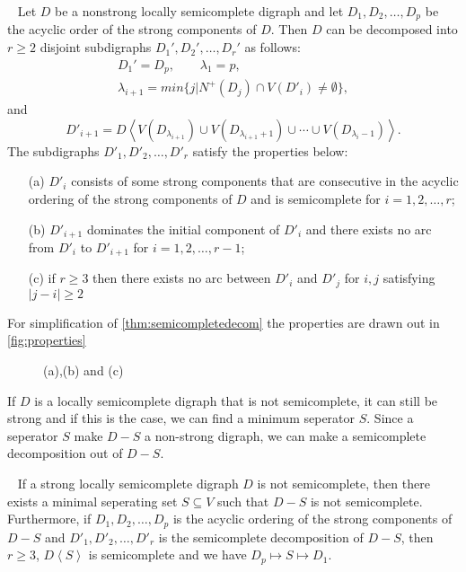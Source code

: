\begin{thm}~\cite{bangJGT85,banggutin,bangJCT102}
    Let $D$ be a nonstrong locally semicomplete digraph and let $D_1,D_2,\dots,D_p$ be the acyclic order of the strong components of $D$. Then $D$ can be decomposed into $r\geq 2$ disjoint subdigraphs $D_1',D_2',\dots, D_r'$ as follows:
    \begin{align*}
        D_1'=D_p, \qquad \lambda_1=p,\\
        \lambda_{i+1}=min\lbrace j|N^+(D_j)\cap V(D'_i)\neq \emptyset\rbrace,
    \end{align*}
    and
    \begin{equation*}
        D'_{i+1}=D\left< V(D_{\lambda_{i+1}})\cup V(D_{\lambda_{i+1}+1})\cup \cdots \cup V(D_{\lambda_{i}-1})\right> .
    \end{equation*}
    The subdigraphs $D'_1,D'_2,\dots,D'_r$ satisfy the properties below:
    \begin{itemize}
        \item[(a)] $D'_i$ consists of some strong components that are consecutive in the acyclic ordering of the strong components of $D$ and is semicomplete for $i=1,2,\dots ,r$;
        \item[(b)] $D'_{i+1}$ dominates the initial component of $D'_i$ and there exists no arc from $D'_i$ to $D'_{i+1}$ for $i=1,2,\dots ,r-1$;
        \item[(c)] if $r\geq 3$ then there exists no arc between $D'_i$ and $D'_j$ for $i,j$ satisfying $|j-i|\geq 2$  
    \end{itemize}
    \label{thm:semicompletedecom}
\end{thm}
For simplification of \autoref{thm:semicompletedecom} the properties are drawn out in \autoref{fig:properties}
\begin{figure}
    \caption{(a),(b) and (c)}
    \label{fig:properties}
\end{figure}
If $D$ is a locally semicomplete digraph that is not semicomplete, it can still be strong and if this is the case, we can find a minimum seperator $S$. Since a seperator $S$ make $D-S$ a non-strong digraph, we can make a semicomplete decomposition out of $D-S$.
\begin{thm}~\cite{banggutin}
    If a strong locally semicomplete digraph $D$ is not semicomplete, then there exists a minimal seperating set $S\subseteq V$ such that $D-S$ is not semicomplete. 
    Furthermore, if $D_1,D_2,\dots , D_p$ is the acyclic ordering of the strong components of $D-S$ and $D'_1,D'_2,\dots ,D'_r$ is the semicomplete decomposition of $D-S$, then $r\geq 3$, $D\left<S\right>$ is semicomplete and we have $D_p\mapsto S\mapsto D_1$.  
\end{thm}

